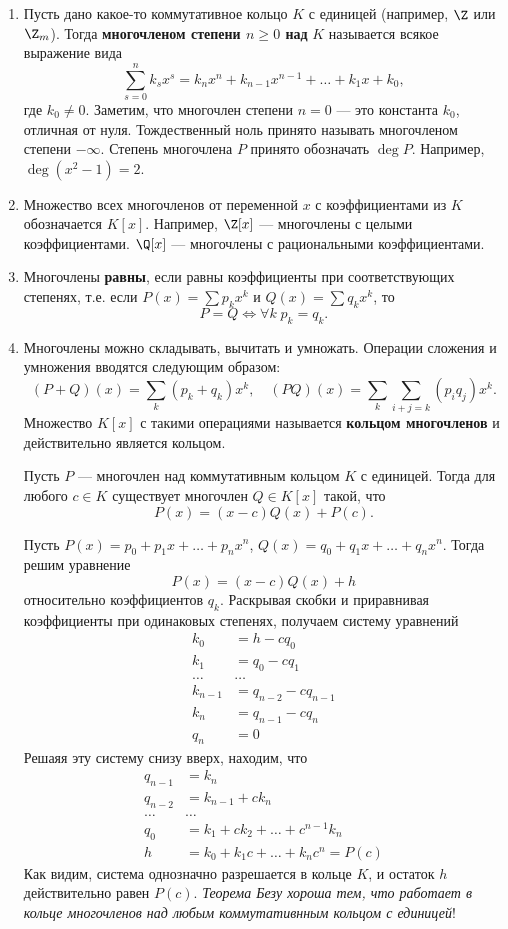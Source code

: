 \begin{enumerate}
\item Пусть дано какое-то коммутативное кольцо $K$ с единицей (например, $\Z$ или $\Z_m$). Тогда \textbf{многочленом степени $n\ge 0$ над} $K$ называется всякое выражение вида
$$
\sum_{s=0}^n k_sx^s = k_nx^n+k_{n-1}x^{n-1}+\dots+k_1x+k_0,
$$
где $k_0\ne 0$. Заметим, что многочлен степени $n=0$ --- это константа $k_0$, отличная от нуля. Тождественный ноль принято называть многочленом степени $-\infty$. Степень многочлена $P$ принято обозначать $\deg P$. Например, $\deg(x^2-1)=2$.
\item Множество всех многочленов от переменной $x$ с коэффициентами из $K$ обозначается $K[x]$.
Например, $\Z[x]$ --- многочлены с целыми коэффициентами. $\Q[x]$ --- многочлены с рациональными коэффициентами.
\item Многочлены \textbf{равны}, если равны коэффициенты при соответствующих степенях, т.е. если $P(x)=\sum p_kx^k$ и $Q(x)=\sum q_kx^k$,
то
$$
P=Q\Leftrightarrow \forall k \; p_k=q_k.
$$
\item Многочлены можно складывать, вычитать и умножать. Операции сложения и умножения вводятся следующим образом:
$$
(P+Q)(x) = \sum_k(p_k+q_k)x^k,\quad (PQ)(x) = \sum_k\sum_{i+j=k}(p_iq_j)x^k.
$$
Множество $K[x]$ с такими операциями называется \textbf{кольцом многочленов} и действительно является кольцом.

\begin{thrm}[Без\'y]
Пусть $P$ --- многочлен над коммутативным кольцом $K$ с единицей. Тогда для любого $c\in K$ существует многочлен $Q\in K[x]$ такой, что
$$
P(x) = (x-c)Q(x) + P(c).
$$
\end{thrm}
\pf
Пусть $P(x)=p_0+p_1x+\dots+p_nx^n$, $Q(x)=q_0+q_1x+\dots+q_nx^n$. Тогда решим уравнение
$$
P(x) = (x-c)Q(x) + h
$$
относительно коэффициентов $q_k$. Раскрывая скобки и приравнивая коэффициенты при одинаковых степенях, получаем систему уравнений
\begin{align*}
k_0 & = h-cq_0 \\
k_1 & = q_0-cq_1 \\
\dots & \dots \\
k_{n-1} & = q_{n-2}-cq_{n-1} \\
k_n & = q_{n-1}-cq_n \\
q_n & =  0
\end{align*}
Решаяя эту систему снизу вверх, находим, что
\begin{align*}
q_{n-1} & = k_n \\
q_{n-2} & = k_{n-1} + c k_n \\
\dots & \dots \\
q_0 & = k_1+ck_2+\dots +c^{n-1}k_n \\
h & =  k_0 + k_1c+\dots +k_nc^n = P(c)
\end{align*}
Как видим, система однозначно разрешается в кольце $K$, и остаток $h$ действительно равен $P(c)$.
\epf
\textit{Теорема Безу хороша тем, что работает в кольце многочленов над любым коммутативнным кольцом с единицей}!


\end{enumerate}
